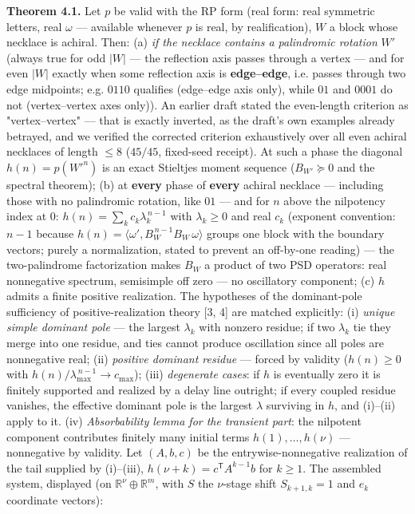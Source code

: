 \documentclass[11pt]{article}
\begin{document}
\textbf{Theorem 4.1.}  Let $p$ be valid with the RP form (real form: real symmetric letters, real $\omega$ — available whenever $p$ is real, by realification), $W$ a block whose necklace is achiral. Then: (a) \emph{if the necklace contains a palindromic rotation} $W'$ (always true for odd $|W|$ — the reflection axis passes through a vertex — and for even $|W|$ exactly when some reflection axis is \textbf{edge–edge}, i.e. passes through two edge midpoints; e.g. $0110$ qualifies (edge–edge axis only), while $01$ and $0001$ do not (vertex–vertex axes only)).  An earlier draft stated the even-length criterion as "vertex–vertex" — that is exactly inverted, as the draft's own examples already betrayed, and we verified the corrected criterion exhaustively over all even achiral necklaces of length $\le 8$ ($45/45$, fixed-seed receipt).  At such a phase the diagonal $h(n) = p(W'^n)$ is an exact Stieltjes moment sequence ($B_{W'} \succeq 0$ and the spectral theorem); (b) at \textbf{every} phase of \textbf{every} achiral necklace — including those with no palindromic rotation, like $01$ — and for $n$ above the nilpotency index at $0$: $h(n) = \sum_k c_k\lambda_k^{\,n-1}$ with $\lambda_k \ge 0$ and real $c_k$ (exponent convention: $n - 1$ because $h(n) = \langle\omega', B_W^{\,n-1} B_W\,\omega\rangle$ groups one block with the boundary vectors; purely a normalization, stated to prevent an off-by-one reading) — the two-palindrome factorization makes $B_W$ a product of two PSD operators: real nonnegative spectrum, semisimple off zero — no oscillatory component; (c) $h$ admits a finite positive realization.  The hypotheses of the dominant-pole sufficiency of positive-realization theory [3, 4] are matched explicitly: (i) \emph{unique simple dominant pole} — the largest $\lambda_k$ with nonzero residue; if two $\lambda_k$ tie they merge into one residue, and ties cannot produce oscillation since all poles are nonnegative real; (ii) \emph{positive dominant residue} — forced by validity ($h(n) \ge 0$ with $h(n)/\lambda_{\max}^{\,n-1} \to c_{\max}$); (iii) \emph{degenerate cases}: if $h$ is eventually zero it is finitely supported and realized by a delay line outright; if every coupled residue vanishes, the effective dominant pole is the largest $\lambda$ surviving in $h$, and (i)–(ii) apply to it.  (iv) \emph{Absorbability lemma for the transient part}: the nilpotent component contributes finitely many initial terms $h(1), \ldots, h(\nu)$ — nonnegative by validity.  Let $(A, b, c)$ be the entrywise-nonnegative realization of the tail supplied by (i)–(iii), $h(\nu + k) = c^{\mathsf T} A^{k-1} b$ for $k \ge 1$.  The assembled system, displayed (on $\mathbb R^\nu \oplus \mathbb R^m$, with $S$ the $\nu$-stage shift $S_{k+1,k} = 1$ and $e_k$ coordinate vectors):
\end{document}
